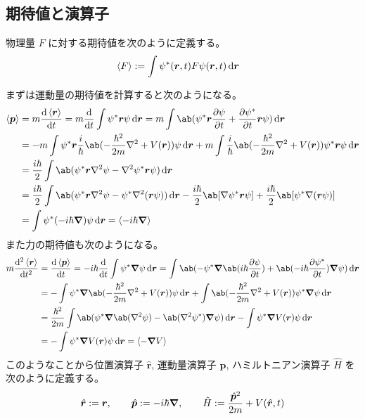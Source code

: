\documentclass[uplatex,dvipdfmx,a4paper,11pt]{jlreq}
\newcommand{\rr}{\bm{r}}
\newcommand{\pp}{\bm{p}}
\numberwithin{equation}{section}
\theoremstyle{definition}
\begin{document}
\subsection{期待値と演算子}
\begin{definition}
  物理量 $F$ に対する期待値を次のように定義する。
  \begin{align}
    \ev{F} & := \int\psi^*(\rr, t)F\psi(\rr, t)\dl{\rr}
  \end{align}
\end{definition}
まずは運動量の期待値を計算すると次のようになる。
\begin{align}
  \ev{\pp} & = m\dv{\ev{\rr}}{t} = m\dv{t}\int\psi^*\rr\psi\dl{\rr} = m\int\ab(\psi^*\rr\diffp{\psi}{t} + \diffp{\psi^*}{t}\rr\psi)\dl{\rr}                                             \\
           & = -m\int\psi^*\rr\frac{i}{\hbar}\ab(-\frac{\hbar^2}{2m}\nabla^2 + V(\rr))\psi\dl{\rr} + m\int\frac{i}{\hbar}\ab(-\frac{\hbar^2}{2m}\nabla^2 + V(\rr))\psi^*\rr\psi\dl{\rr} \\
           & = \frac{i\hbar}{2}\int\ab(\psi^*\rr\nabla^2\psi - \nabla^2\psi^*\rr\psi)\dl{\rr}                                                                                           \\
           & = \frac{i\hbar}{2}\int\ab(\psi^*\rr\nabla^2\psi - \psi^*\nabla^2(\rr\psi))\dl{\rr} - \frac{i\hbar}{2}\ab[\nabla\psi^*\rr\psi] + \frac{i\hbar}{2}\ab[\psi^*\nabla(\rr\psi)] \\
           & = \int\psi^*(-i\hbar\vnabla)\psi\dl{\rr} = \ev{-i\hbar\vnabla}
\end{align}
また力の期待値も次のようになる。
\begin{align}
  m\dv[2]{\ev{\rr}}{t} & = \dv{\ev{\pp}}{t} = -i\hbar\dv{t}\int\psi^*\vnabla\psi\dl{\rr} = \int\ab(-\psi^*\vnabla\ab(i\hbar\diffp{\psi}{t}) + \ab(-i\hbar\diffp{\psi^*}{t})\vnabla\psi)\dl{\rr} \\
                       & = -\int\psi^*\vnabla\ab(-\frac{\hbar^2}{2m}\nabla^2 + V(\rr))\psi\dl{\rr} + \int\ab(-\frac{\hbar^2}{2m}\nabla^2 + V(\rr))\psi^*\vnabla\psi\dl{\rr}                     \\
                       & = \frac{\hbar^2}{2m}\int\ab(\psi^*\vnabla\ab(\nabla^2\psi) - \ab(\nabla^2\psi^*)\vnabla\psi)\dl{\rr} - \int\psi^*\vnabla V(\rr)\psi\dl{\rr}                            \\
                       & = - \int\psi^*\vnabla V(\rr)\psi\dl{\rr} = \ev{-\vnabla V}
\end{align}
このようなことから位置演算子 $\hat{\rr}$, 運動量演算子 $\hat{\pp}$, ハミルトニアン演算子 $\hat{H}$ を次のように定義する。
\begin{align}
  \hat{\rr} := \rr, \qquad \hat{\pp} := -i\hbar\vnabla, \qquad \hat{H} := \frac{\hat{\pp}^2}{2m} + V(\hat{\rr}, t)
\end{align}
\end{document}
